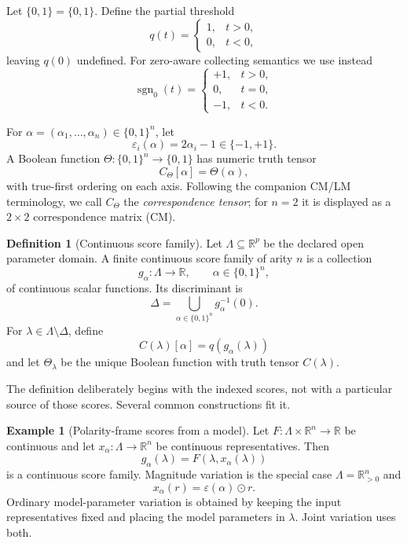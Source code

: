 \documentclass[11pt]{article}
\theoremstyle{definition}
\newtheorem{definition}[theorem]{Definition}
\newtheorem{example}[theorem]{Example}
\theoremstyle{remark}
\newcommand{\R}{\mathbb{R}}
\newcommand{\B}{\{0,1\}}
\newcommand{\sgnzero}{\operatorname{sgn}_0}
\newcommand{\eps}{\varepsilon}
\newcommand{\Deltaop}{\Delta}
\begin{document}
Let $\B=\{0,1\}$. Define the partial threshold
\[
 q(t)=\begin{cases}1,&t>0,\\0,&t<0,\end{cases}
\]
leaving $q(0)$ undefined. For zero-aware collecting semantics we use instead
\[
 \sgnzero(t)=\begin{cases}+1,&t>0,\\0,&t=0,\\-1,&t<0.\end{cases}
\]

For $\alpha=(\alpha_1,\ldots,\alpha_n)\in\B^n$, let
\[
 \eps_i(\alpha)=2\alpha_i-1\in\{-1,+1\}.
\]
A Boolean function $\Theta:\B^n\to\B$ has numeric truth tensor
\[
 C_\Theta[\alpha]=\Theta(\alpha),
\]
with true-first ordering on each axis. Following the companion CM/LM terminology, we call $C_\Theta$ the \emph{correspondence tensor}; for $n=2$ it is displayed as a $2\times2$ correspondence matrix (CM).

\begin{definition}[Continuous score family]\label{def:scorefamily}
Let $\Lambda\subseteq\R^p$ be the declared open parameter domain. A finite continuous score family of arity $n$ is a collection
\[
 g_\alpha:\Lambda\to\R,
 \qquad \alpha\in\B^n,
\]
of continuous scalar functions. Its discriminant is
\begin{equation}\label{eq:discriminant}
 \Deltaop=\bigcup_{\alpha\in\B^n}g_\alpha^{-1}(0).
\end{equation}
For $\lambda\in\Lambda\setminus\Deltaop$, define
\begin{equation}\label{eq:tensorlambda}
 C(\lambda)[\alpha]=q(g_\alpha(\lambda))
\end{equation}
and let $\Theta_\lambda$ be the unique Boolean function with truth tensor $C(\lambda)$.
\end{definition}

The definition deliberately begins with the indexed scores, not with a particular source of those scores. Several common constructions fit it.

\begin{example}[Polarity-frame scores from a model]\label{ex:polarity}
Let $F:\Lambda\times\R^n\to\R$ be continuous and let $x_\alpha:\Lambda\to\R^n$ be continuous representatives. Then
\[
 g_\alpha(\lambda)=F(\lambda,x_\alpha(\lambda))
\]
is a continuous score family. Magnitude variation is the special case $\Lambda=\R_{>0}^n$ and
\[
 x_\alpha(r)=\eps(\alpha)\odot r.
\]
Ordinary model-parameter variation is obtained by keeping the input representatives fixed and placing the model parameters in $\lambda$. Joint variation uses both.
\end{example}
\end{document}

